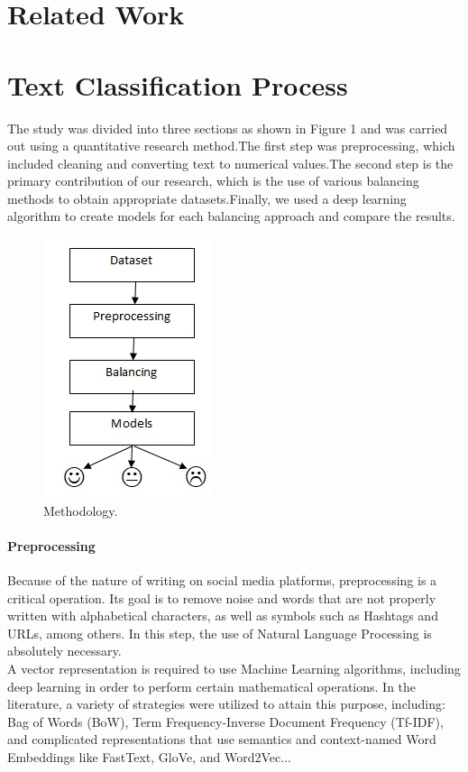 \documentclass[conference]{IEEEtran}
\begin{document}
	
	\section{Related Work}
	\section{Text Classification Process}
	The study was divided into three sections as shown in Figure 1 and was carried out using a quantitative research method.The first step was preprocessing, which included cleaning and converting text to numerical values.The second step is the primary contribution of our research, which is the use of various balancing methods to obtain appropriate datasets.Finally, we used a deep learning algorithm to create models for each balancing approach and compare the results. 
	
	
	\begin{figure}[htbp]
		\centerline{\includegraphics[scale=0.70]{images/model}}
		\caption{Methodology.}
		\label{fig}
	\end{figure}
	
	\paragraph{Preprocessing}
	Because of the nature of writing on social media platforms, preprocessing is a critical operation. Its goal is to remove noise and words that are not properly written with alphabetical characters, as well as symbols such as Hashtags and URLs, among others. In this step, the use of Natural Language Processing is absolutely necessary. \\
	A vector representation is required to use Machine Learning algorithms, including deep learning in order to perform certain mathematical operations.  In the literature, a variety of strategies were utilized to attain this purpose, including:
	Bag of Words (BoW), Term Frequency-Inverse Document Frequency (Tf-IDF), and complicated representations that use semantics and context-named Word Embeddings like FastText, GloVe, and Word2Vec...
	
\end{document}

